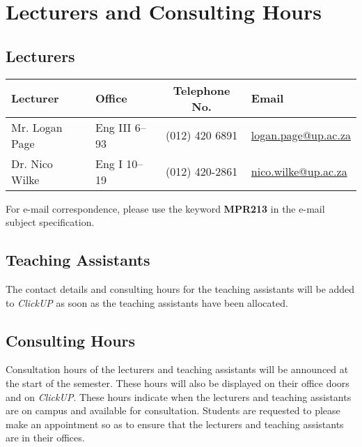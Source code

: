 \section{Lecturers and Consulting Hours}
    \subsection{Lecturers}
        \begin{table}[!h]
            \begin{center}
             \begin{tabular}{|l|l|c|l|}
                 \hline
                 {\bf Lecturer} & {\bf Office} & {\bf Telephone No.} & {\bf Email} \\
                 \hline
                 Mr. Logan Page &
                 Eng III 6--93 &
                 (012) 420 6891 &
                 \href{mailto:logan.page@up.ac.za}{logan.page@up.ac.za} \\
                 Dr. Nico Wilke &
                 Eng I 10--19 &
                 (012) 420-2861 &
                 \href{mailto:nico.wilke@up.ac.za}{nico.wilke@up.ac.za} \\
                 \hline
             \end{tabular}
            \end{center}
        \end{table}

        For e-mail correspondence, please use the keyword
        \textbf{MPR213} in the e-mail subject specification.

    \subsection{Teaching Assistants}
        The contact details and consulting hours for the teaching assistants
        will be added to {\it ClickUP} as soon as the teaching assistants have been
        allocated.

    \subsection{Consulting Hours}
        Consultation hours of the lecturers and teaching assistants will be
        announced at the start of the semester. These hours will also be
        displayed on their office doors and on {\it ClickUP}. These hours indicate
        when the lecturers and teaching assistants are on campus and available
        for consultation. Students are requested to please make an appointment
        so as to ensure that the lecturers and teaching assistants are in their
        offices.

